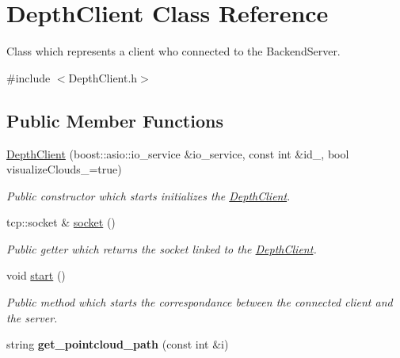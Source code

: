 \hypertarget{class_depth_client}{\section{Depth\+Client Class Reference}
\label{class_depth_client}
}


Class which represents a client who connected to the Backend\+Server.  




{\ttfamily \#include $<$Depth\+Client.\+h$>$}

\subsection*{Public Member Functions}
\begin{DoxyCompactItemize}
\item 
\hyperlink{class_depth_client_a0e4751e122fcddf72547252a58ce46ab}{Depth\+Client} (boost\+::asio\+::io\+\_\+service \&io\+\_\+service, const int \&id\+\_\+, bool visualize\+Clouds\+\_\+=true)
\begin{DoxyCompactList}\small\item\em Public constructor which starts initializes the \hyperlink{class_depth_client}{Depth\+Client}. \end{DoxyCompactList}\item 
\hypertarget{class_depth_client_aa9682f7ce54fb6e87ae2fd6e1c668b7f}{tcp\+::socket \& \hyperlink{class_depth_client_aa9682f7ce54fb6e87ae2fd6e1c668b7f}{socket} ()}\label{class_depth_client_aa9682f7ce54fb6e87ae2fd6e1c668b7f}

\begin{DoxyCompactList}\small\item\em Public getter which returns the socket linked to the \hyperlink{class_depth_client}{Depth\+Client}. \end{DoxyCompactList}\item 
\hypertarget{class_depth_client_a32cc929b9902a4f9f488b1c609048cb5}{void \hyperlink{class_depth_client_a32cc929b9902a4f9f488b1c609048cb5}{start} ()}\label{class_depth_client_a32cc929b9902a4f9f488b1c609048cb5}

\begin{DoxyCompactList}\small\item\em Public method which starts the correspondance between the connected client and the server. \end{DoxyCompactList}\item 
\hypertarget{class_depth_client_ae13bf20205ccd9815a716ada83745794}{string {\bfseries get\+\_\+pointcloud\+\_\+path} (const int \&i)}\label{class_depth_client_ae13bf20205ccd9815a716ada83745794}


\end{DoxyCompactItemize}
